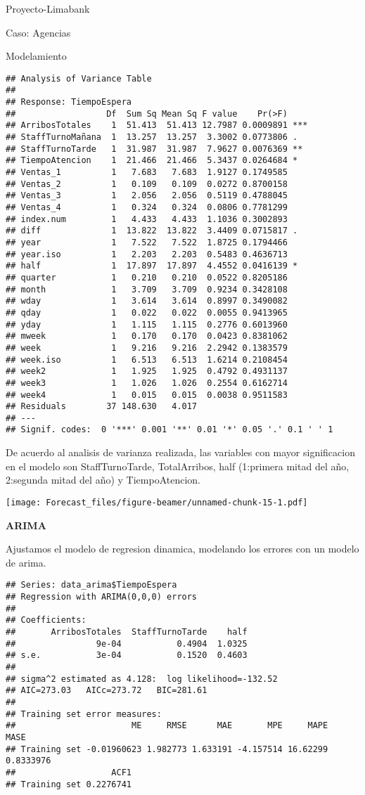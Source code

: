 \documentclass[
  ignorenonframetext,
]{beamer}
\begin{document}
\begin{frame}[fragile]{Proyecto-Limabank}
\begin{block}{Caso: Agencias}
\begin{block}{Modelamiento}
\begin{verbatim}
## Analysis of Variance Table
## 
## Response: TiempoEspera
##                  Df  Sum Sq Mean Sq F value    Pr(>F)    
## ArribosTotales    1  51.413  51.413 12.7987 0.0009891 ***
## StaffTurnoMañana  1  13.257  13.257  3.3002 0.0773806 .  
## StaffTurnoTarde   1  31.987  31.987  7.9627 0.0076369 ** 
## TiempoAtencion    1  21.466  21.466  5.3437 0.0264684 *  
## Ventas_1          1   7.683   7.683  1.9127 0.1749585    
## Ventas_2          1   0.109   0.109  0.0272 0.8700158    
## Ventas_3          1   2.056   2.056  0.5119 0.4788045    
## Ventas_4          1   0.324   0.324  0.0806 0.7781299    
## index.num         1   4.433   4.433  1.1036 0.3002893    
## diff              1  13.822  13.822  3.4409 0.0715817 .  
## year              1   7.522   7.522  1.8725 0.1794466    
## year.iso          1   2.203   2.203  0.5483 0.4636713    
## half              1  17.897  17.897  4.4552 0.0416139 *  
## quarter           1   0.210   0.210  0.0522 0.8205186    
## month             1   3.709   3.709  0.9234 0.3428108    
## wday              1   3.614   3.614  0.8997 0.3490082    
## qday              1   0.022   0.022  0.0055 0.9413965    
## yday              1   1.115   1.115  0.2776 0.6013960    
## mweek             1   0.170   0.170  0.0423 0.8381062    
## week              1   9.216   9.216  2.2942 0.1383579    
## week.iso          1   6.513   6.513  1.6214 0.2108454    
## week2             1   1.925   1.925  0.4792 0.4931137    
## week3             1   1.026   1.026  0.2554 0.6162714    
## week4             1   0.015   0.015  0.0038 0.9511583    
## Residuals        37 148.630   4.017                      
## ---
## Signif. codes:  0 '***' 0.001 '**' 0.01 '*' 0.05 '.' 0.1 ' ' 1
\end{verbatim}

De acuerdo al analisis de varianza realizada, las variables con mayor
significacion en el modelo son StaffTurnoTarde, TotalArribos, half
(1:primera mitad del año, 2:segunda mitad del año) y TiempoAtencion.

\texttt{[image: Forecast\_files/figure-beamer/unnamed-chunk-15-1.pdf]}

\textbf{ARIMA}

Ajustamos el modelo de regresion dinamica, modelando los errores con un
modelo de arima.

\begin{verbatim}
## Series: data_arima$TiempoEspera 
## Regression with ARIMA(0,0,0) errors 
## 
## Coefficients:
##       ArribosTotales  StaffTurnoTarde    half
##                9e-04           0.4904  1.0325
## s.e.           3e-04           0.1520  0.4603
## 
## sigma^2 estimated as 4.128:  log likelihood=-132.52
## AIC=273.03   AICc=273.72   BIC=281.61
## 
## Training set error measures:
##                       ME     RMSE      MAE       MPE     MAPE      MASE
## Training set -0.01960623 1.982773 1.633191 -4.157514 16.62299 0.8333976
##                   ACF1
## Training set 0.2276741
\end{verbatim}


\end{block}
\end{block}
\end{frame}
\end{document}
